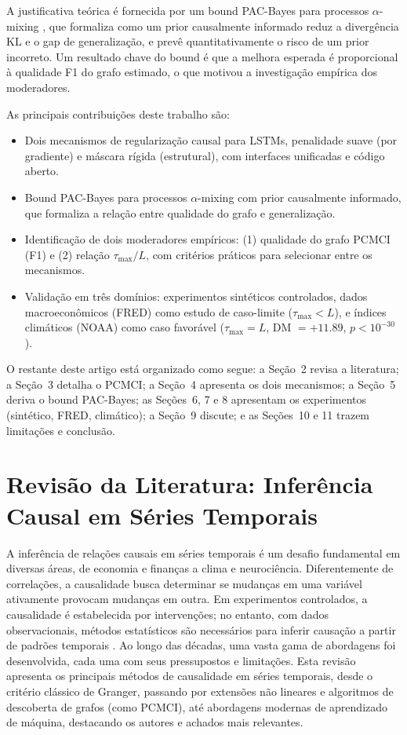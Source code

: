 \documentclass[12pt, a4paper]{article}
\begin{document}
A justificativa teórica é fornecida por um bound PAC-Bayes para processos $\alpha$-mixing \cite{alquier2012mixing}, que formaliza como um prior causalmente informado reduz a divergência KL e o gap de generalização, e prevê quantitativamente o risco de um prior incorreto. Um resultado chave do bound é que a melhora esperada é proporcional à qualidade F1 do grafo estimado, o que motivou a investigação empírica dos moderadores.

As principais contribuições deste trabalho são:
\begin{itemize}
    \item Dois mecanismos de regularização causal para LSTMs, penalidade suave (por gradiente) e máscara rígida (estrutural), com interfaces unificadas e código aberto.
    \item Bound PAC-Bayes para processos $\alpha$-mixing com prior causalmente informado, que formaliza a relação entre qualidade do grafo e generalização.
    \item Identificação de dois moderadores empíricos: (1) qualidade do grafo PCMCI (F1) e (2) relação $\tau_{\max}/L$, com critérios práticos para selecionar entre os mecanismos.
    \item Validação em três domínios: experimentos sintéticos controlados, dados macroeconômicos (FRED) como estudo de caso-limite ($\tau_{\max} < L$), e índices climáticos (NOAA) como caso favorável ($\tau_{\max} = L$, DM $= +11.89$, $p < 10^{-30}$).
\end{itemize}

O restante deste artigo está organizado como segue: a Seção~2 revisa a literatura; a Seção~3 detalha o PCMCI; a Seção~4 apresenta os dois mecanismos; a Seção~5 deriva o bound PAC-Bayes; as Seções~6, 7 e 8 apresentam os experimentos (sintético, FRED, climático); a Seção~9 discute; e as Seções~10 e 11 trazem limitações e conclusão.


\section{Revisão da Literatura: Inferência Causal em Séries Temporais}

A inferência de relações causais em séries temporais é um desafio fundamental em diversas áreas, de economia e finanças a clima e neurociência. Diferentemente de correlações, a causalidade busca determinar se mudanças em uma variável ativamente provocam mudanças em outra. Em experimentos controlados, a causalidade é estabelecida por intervenções; no entanto, com dados observacionais, métodos estatísticos são necessários para inferir causação a partir de padrões temporais \cite{granger1969}. Ao longo das décadas, uma vasta gama de abordagens foi desenvolvida, cada uma com seus pressupostos e limitações. Esta revisão apresenta os principais métodos de causalidade em séries temporais, desde o critério clássico de Granger, passando por extensões não lineares e algoritmos de descoberta de grafos (como PCMCI), até abordagens modernas de aprendizado de máquina, destacando os autores e achados mais relevantes.
\end{document}
